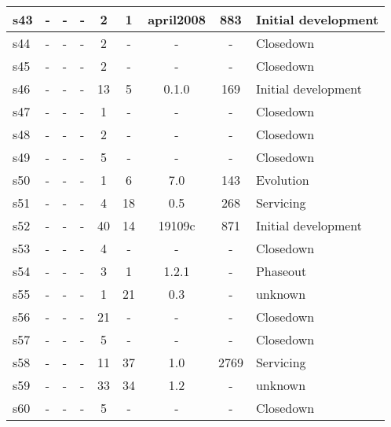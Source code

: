 \begin{longtable}{| l | l | l | l | c | c | c | c | l |}
    \hline
s43 & - & - & - & 2 & 1 & april2008 & 883 & Initial development \\
    \hline
s44 & - & - & - & 2 & - & - & - & Closedown \\
    \hline
s45 & - & - & - & 2 & - & - & - & Closedown \\
    \hline
s46 & - & - & - & 13 & 5 & 0.1.0 & 169 & Initial development \\
    \hline
s47 & - & - & - & 1 & - & - & - & Closedown \\
    \hline
s48 & - & - & - & 2 & - & - & - & Closedown \\
    \hline
s49 & - & - & - & 5 & - & - & - & Closedown \\
    \hline
s50 & - & - & - & 1 & 6 & 7.0 & 143 & Evolution \\
    \hline
s51 & - & - & - & 4 & 18 & 0.5 & 268 & Servicing \\
    \hline
s52 & - & - & - & 40 & 14 & 19109c & 871 & Initial development \\
    \hline
s53 & - & - & - & 4 & - & - & - & Closedown \\
    \hline
s54 & - & - & - & 3 & 1 & 1.2.1 & - & Phaseout \\
    \hline
s55 & - & - & - & 1 & 21 & 0.3 & - & unknown \\
    \hline
s56 & - & - & - & 21 & - & - & - & Closedown \\
    \hline
s57 & - & - & - & 5 & - & - & - & Closedown \\
    \hline
s58 & - & - & - & 11 & 37 & 1.0 & 2769 & Servicing \\
    \hline
s59 & - & - & - & 33 & 34 & 1.2 & - & unknown \\
    \hline
s60 & - & - & - & 5 & - & - & - & Closedown \\
    \hline
  \hline
\end{longtable}
